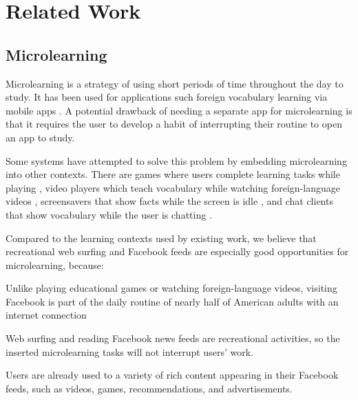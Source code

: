 \documentclass{sigchi}
\begin{document}
\section{Related Work}

\subsection{Microlearning}

Microlearning is a strategy of using short periods of time throughout the day to study. It has been used for applications such foreign vocabulary learning via mobile apps \cite{microlearning} \cite{micromandarin}. A potential drawback of needing a separate app for microlearning is that it requires the user to develop a habit of interrupting their routine to open an app to study. %

Some systems have attempted to solve this problem by embedding microlearning into other contexts. There are games where users complete learning tasks while playing \cite{carriearcade}, video players which teach vocabulary while watching foreign-language videos \cite{smartsubtitles}, screensavers that show facts while the screen is idle \cite{screensaver}, and chat clients that show vocabulary while the user is chatting \cite{cai2015wait}.

Compared to the learning contexts used by existing work, we believe that recreational web surfing and Facebook feeds are especially good opportunities for microlearning, because:

\begin{compactitem}
\item Unlike playing educational games or watching foreign-language videos, visiting Facebook is part of the daily routine of nearly half of American adults with an internet connection \cite{socialmediaupdate} %
\item Web surfing and reading Facebook news feeds are recreational activities, so the inserted microlearning tasks will not interrupt users' work.
\item Users are already used to a variety of rich content appearing in their Facebook feeds, such as videos, games, recommendations, and advertisements.
\end{compactitem}
\end{document}
